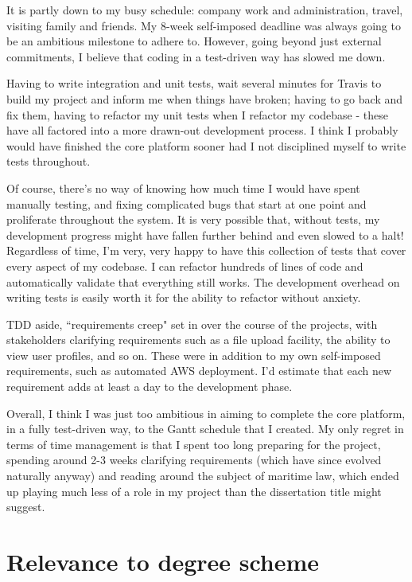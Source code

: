 It is partly down to my busy schedule: company work and administration, travel, visiting family and friends. My 8-week self-imposed deadline was always going to be an ambitious milestone to adhere to. However, going beyond just external commitments, I believe that coding in a test-driven way has slowed me down.

Having to write integration and unit tests, wait several minutes for Travis to build my project and inform me when things have broken; having to go back and fix them, having to refactor my unit tests when I refactor my codebase - these have all factored into a more drawn-out development process. I think I probably would have finished the core platform sooner had I not disciplined myself to write tests throughout.

Of course, there's no way of knowing how much time I would have spent manually testing, and fixing complicated bugs that start at one point and proliferate throughout the system. It is very possible that, without tests, my development progress might have fallen further behind and even slowed to a halt! Regardless of time, I'm very, very happy to have this collection of tests that cover every aspect of my codebase. I can refactor hundreds of lines of code and automatically validate that everything still works. The development overhead on writing tests is easily worth it for the ability to refactor without anxiety.

TDD aside, ``requirements creep" set in over the course of the projects, with stakeholders clarifying requirements such as a file upload facility, the ability to view user profiles, and so on. These were in addition to my own self-imposed requirements, such as automated AWS deployment. I'd estimate that each new requirement adds at least a day to the development phase.

Overall, I think I was just too ambitious in aiming to complete the core platform, in a fully test-driven way, to the Gantt schedule that I created. My only regret in terms of time management is that I spent too long preparing for the project, spending around 2-3 weeks clarifying requirements (which have since evolved naturally anyway) and reading around the subject of maritime law, which ended up playing much less of a role in my project than the dissertation title might suggest.

\section{Relevance to degree scheme}

